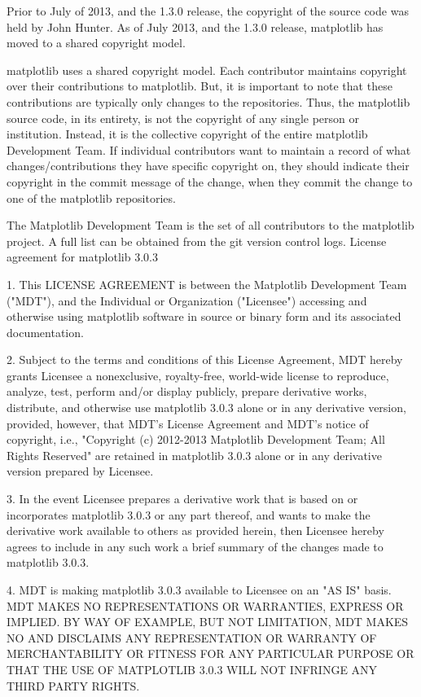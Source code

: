 Prior to July of 2013, and the 1.3.0 release, the copyright of the source code was held by John Hunter. As of July 2013, and the 1.3.0 release, matplotlib has moved to a shared copyright model.

matplotlib uses a shared copyright model. Each contributor maintains copyright over their contributions to matplotlib. But, it is important to note that these contributions are typically only changes to the repositories. Thus, the matplotlib source code, in its entirety, is not the copyright of any single person or institution. Instead, it is the collective copyright of the entire matplotlib Development Team. If individual contributors want to maintain a record of what changes/contributions they have specific copyright on, they should indicate their copyright in the commit message of the change, when they commit the change to one of the matplotlib repositories.

The Matplotlib Development Team is the set of all contributors to the matplotlib project. A full list can be obtained from the git version control logs.
License agreement for matplotlib 3.0.3

1. This LICENSE AGREEMENT is between the Matplotlib Development Team ("MDT"), and the Individual or Organization ("Licensee") accessing and otherwise using matplotlib software in source or binary form and its associated documentation.

2. Subject to the terms and conditions of this License Agreement, MDT hereby grants Licensee a nonexclusive, royalty-free, world-wide license to reproduce, analyze, test, perform and/or display publicly, prepare derivative works, distribute, and otherwise use matplotlib 3.0.3 alone or in any derivative version, provided, however, that MDT's License Agreement and MDT's notice of copyright, i.e., "Copyright (c) 2012-2013 Matplotlib Development Team; All Rights Reserved" are retained in matplotlib 3.0.3 alone or in any derivative version prepared by Licensee.

3. In the event Licensee prepares a derivative work that is based on or incorporates matplotlib 3.0.3 or any part thereof, and wants to make the derivative work available to others as provided herein, then Licensee hereby agrees to include in any such work a brief summary of the changes made to matplotlib 3.0.3.

4. MDT is making matplotlib 3.0.3 available to Licensee on an "AS IS" basis. MDT MAKES NO REPRESENTATIONS OR WARRANTIES, EXPRESS OR IMPLIED. BY WAY OF EXAMPLE, BUT NOT LIMITATION, MDT MAKES NO AND DISCLAIMS ANY REPRESENTATION OR WARRANTY OF MERCHANTABILITY OR FITNESS FOR ANY PARTICULAR PURPOSE OR THAT THE USE OF MATPLOTLIB 3.0.3 WILL NOT INFRINGE ANY THIRD PARTY RIGHTS.

